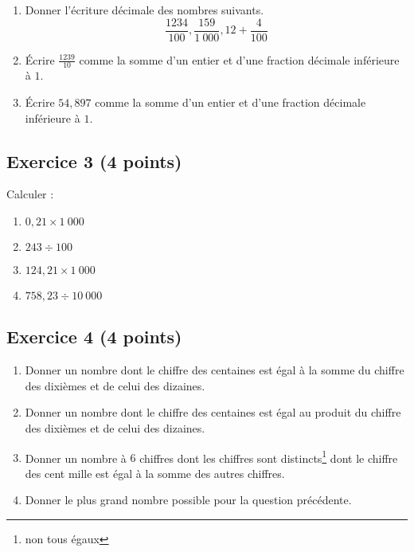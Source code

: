 \documentclass[12 pt]{extarticle}
\theoremstyle{plain}
\begin{document}
  \begin{enumerate}
  \item Donner l'écriture décimale des nombres suivants. 
  \[ \frac{1234}{100}, \frac{159}{1\ 000}, 
  12+ \frac{4}{100}\] 
  \item Écrire $\displaystyle\frac{1239}{10}$ comme la somme d'un entier et d'une fraction décimale inférieure à $1$. 
    \item Écrire $54,897$ comme la somme d'un entier et d'une fraction décimale inférieure à $1$. 
  
  \end{enumerate}
  
  \subsection*{Exercice 3 (4 points)}
  
  Calculer : \begin{enumerate}
  \item $0,21 \times 1\ 000$
  \item $243\div 100$
  \item $124,21\times 1\ 000$ 
  \item $758,23 \div 10\ 000$
  \end{enumerate}
  
  \subsection*{Exercice 4 (4 points)}

\begin{enumerate}
\item Donner un nombre dont le chiffre des centaines est égal à la somme du chiffre des dixièmes et de celui des dizaines.

\item Donner un nombre dont le chiffre des centaines est égal au produit du chiffre des dixièmes et de celui des dizaines.

\item Donner un nombre à $6$ chiffres dont les chiffres sont distincts\footnote{non tous égaux} dont le chiffre des cent mille est égal à la somme des autres chiffres.
\item Donner le plus grand nombre possible pour la question précédente. 
\end{enumerate}


 	
\end{document}
